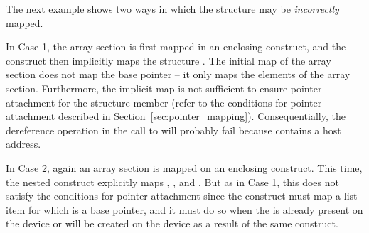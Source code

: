 %
%


The next example shows two ways in which the structure may be
\emph{incorrectly} mapped.

In Case 1, the array section  is first mapped in an enclosing
 construct, and the  construct then
implicitly maps the structure . The initial map of the array section
does not map the base pointer  -- it only maps the elements of the
array section.  Furthermore, the implicit map is not sufficient to ensure
pointer attachment for the structure member  (refer to the conditions
for pointer attachment described in Section~\ref{sec:pointer_mapping}).
Consequentially, the dereference operation  in the call to
 will probably fail because  contains a host address.

In Case 2, again an array section is mapped on an enclosing
 construct. This time, the nested 
construct explicitly maps , , and . But as in
Case 1, this does not satisfy the conditions for pointer attachment since the
construct must map a list item for which  is a base pointer, and it
must do so when the  is already present on the device or will be
created on the device as a result of the same construct.

